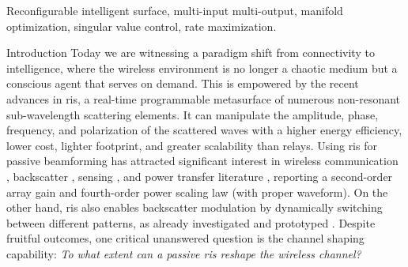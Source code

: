 \documentclass[journal]{IEEEtran}
\begin{document}
\begin{IEEEkeywords}
	Reconfigurable intelligent surface, multi-input multi-output, manifold optimization, singular value control, rate maximization.
\end{IEEEkeywords}

\glsresetall

\begin{section}{Introduction}
	Today we are witnessing a paradigm shift from connectivity to intelligence, where the wireless environment is no longer a chaotic medium but a conscious agent that serves on demand.
	This is empowered by the recent advances in \gls{ris}, a real-time programmable metasurface of numerous non-resonant sub-wavelength scattering elements.
	It can manipulate the amplitude, phase, frequency, and polarization of the scattered waves \cite{Basar2019} with a higher energy efficiency, lower cost, lighter footprint, and greater scalability than relays.
	Using \gls{ris} for {passive beamforming} has attracted significant interest in wireless communication \cite{Wu2019,Wu2020c,Yang2020,Zheng2021}, backscatter \cite{Jia2020,Liang2022}, sensing \cite{Liu2022a,Hua2023}, and power transfer literature \cite{Wu2021d,Feng2022,Zhao2022}, reporting a second-order array gain and fourth-order power scaling law (with proper waveform).
	On the other hand, \gls{ris} also enables {backscatter modulation} by dynamically switching between different patterns, as already investigated \cite{Karasik2020,Basar2020,Zhao2022a} and prototyped \cite{Tang2019a,Dai2020a}.
	Despite fruitful outcomes, one critical unanswered question is the {channel shaping} capability: \emph{To what extent can a passive \gls{ris} reshape the wireless channel?}


\end{section}
\end{document}
